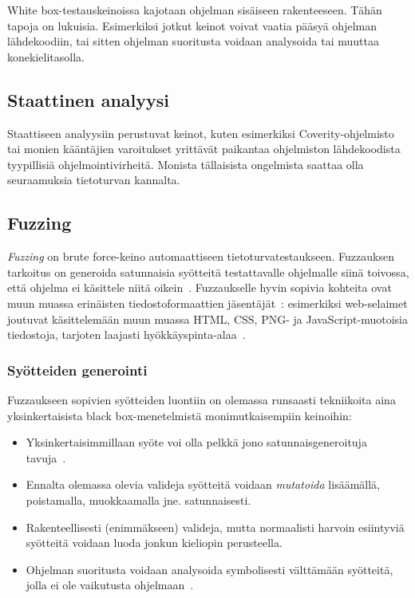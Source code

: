 White box-testauskeinoissa kajotaan ohjelman sisäiseen rakenteeseen.
Tähän tapoja on lukuisia.
Esimerkiksi jotkut keinot voivat vaatia pääsyä ohjelman lähdekoodiin,
tai sitten ohjelman suoritusta voidaan analysoida tai muuttaa konekielitasolla.

\subsection{Staattinen analyysi}

Staattiseen analyysiin perustuvat keinot,
kuten esimerkiksi Coverity-ohjelmisto~\cite{Coverity} tai monien kääntäjien varoitukset yrittävät paikantaa ohjelmiston lähdekoodista tyypillisiä ohjelmointivirheitä.
Monista tällaisista ongelmista saattaa olla seuraamuksia tietoturvan kannalta.

\subsection{Fuzzing}

\emph{Fuzzing} on brute force-keino automaattiseen tietoturvatestaukseen.
Fuzzauksen tarkoitus on generoida satunnaisia syötteitä testattavalle ohjelmalle siinä toivossa, että ohjelma ei käsittele niitä oikein~\cite{UnixReliability}.
Fuzzaukselle hyvin sopivia kohteita ovat muun muassa erinäisten tiedostoformaattien jäsentäjät~\cite{SageArtikkeli,OuluBrowser}:
esimerkiksi web-selaimet joutuvat käsittelemään muun muassa HTML, CSS, PNG- ja JavaScript-muotoisia tiedostoja, tarjoten laajasti hyökkäyspinta-alaa~\cite{OuluBrowser}.

\subsubsection{Syötteiden generointi}

Fuzzaukseen sopivien syötteiden luontiin on olemassa runsaasti tekniikoita aina yksinkertaisista black box-menetelmistä monimutkaisempiin keinoihin:
\begin{itemize}
    \item Yksinkertaisimmillaan syöte voi olla pelkkä jono satunnaisgeneroituja tavuja~\cite{UnixReliability}.
    \item Ennalta olemassa olevia valideja syötteitä voidaan \emph{mutatoida} lisäämällä, poistamalla, muokkaamalla jne. satunnaisesti.
    \item Rakenteellisesti (enimmäkseen) valideja, mutta normaalisti harvoin esiintyviä syötteitä voidaan luoda jonkun kieliopin perusteella.
    \item Ohjelman suoritusta voidaan analysoida symbolisesti välttämään syötteitä, jolla ei ole vaikutusta ohjelmaan~\cite{SageArtikkeli}.
\end{itemize}

